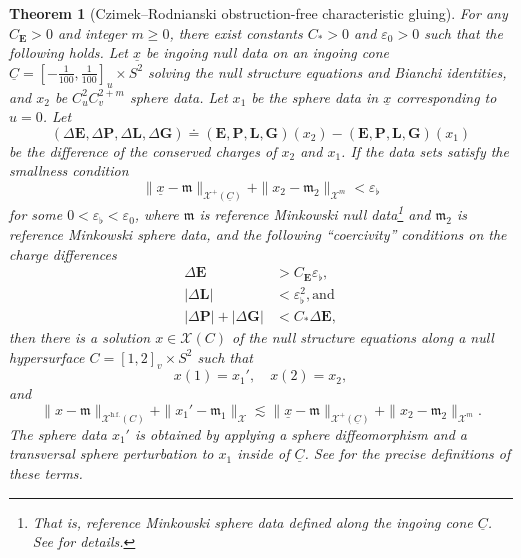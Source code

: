 \documentclass[10pt]{article}
\numberwithin{equation}{section}
\theoremstyle{plain}
\newtheorem{thm}{Theorem}%
\theoremstyle{definition}
\newcommand{\ve}{\varepsilon}
\newcommand{\les}{\lesssim}
\begin{document}
\begin{thm}[Czimek--Rodnianski obstruction-free characteristic gluing]\label{thm:CR}
For any $C_\mathbf E>0$ and integer $m\ge 0$, there exist constants $C_*>0$ and $\ve_0>0$ such that the following holds. Let $\underline x$ be ingoing null data on an ingoing cone $\underline C=[-\frac{1}{100},\frac{1}{100}]_u\times S^2$ solving the null structure equations and Bianchi identities, and $x_2$ be $C^2_u C^{2+m}_{v}$ sphere data. Let $x_1$ be the sphere data in $\underline x$ corresponding to $u=0$. Let 
\begin{equation*}
    (\Delta \mathbf E,\Delta\mathbf P,\Delta\mathbf L,\Delta\mathbf G)\doteq (\mathbf E,\mathbf P,\mathbf L,\mathbf G)(x_2)- (\mathbf E,\mathbf P,\mathbf L,\mathbf G)(x_1)
\end{equation*}
be the difference of the conserved charges of $x_2$ and $x_1$. If the data sets satisfy the smallness condition
\begin{equation}
    \|\underline x-\mathfrak m\|_{\mathcal X^+(\underline C)}+\|x_2-\mathfrak m_2\|_{\mathcal X^m}<\ve_\flat\label{eq:CR-cond-4}
\end{equation} 
for some $0<\ve_\flat<\ve_0$, where $\mathfrak m$ is reference Minkowski null data\footnote{That is, reference Minkowski sphere data defined along the ingoing cone $\underline{C}$. See \cite{ACR2} for details.} and $\mathfrak m_2$ is reference Minkowski sphere data, and the following ``coercivity'' conditions on the charge differences
\begin{align}
\label{eq:CR-cond-1}    \Delta\mathbf E &> C_\mathbf E \ve_\flat, \\
 \label{eq:CR-cond-2}     |\Delta\mathbf L|&< \ve^2_\flat, \text{and} \\
  \label{eq:CR-cond-3}    |\Delta \mathbf P|+|\Delta\mathbf G| &< C_*\Delta \mathbf E,
\end{align}
then there is a solution $x\in  \mathcal X(C)$ of the null structure equations along a null hypersurface $C=[1,2]_v\times S^2$ such that 
\begin{equation}
    x(1)=x_1' ,\quad x(2)=x_2,\label{eq:matching-1}
\end{equation}
and 
\begin{equation*}
    \|x-\mathfrak m\|_{\mathcal X^{\mathrm{h.f.}}(C)}+\| x_1'-\mathfrak m_1\|_{\mathcal X}\les \|\underline x-\mathfrak m\|_{\mathcal X^+(\underline C)}+\|x_2-\mathfrak m_2\|_{\mathcal X^m}.
\end{equation*}
The sphere data $x_1'$ is 
obtained by applying a sphere diffeomorphism and a transversal sphere perturbation to $x_1$ inside of $\underline C$. See \cite{ACR2, Czimek2022-cl} for the precise definitions of these terms.
\end{thm}
\end{document}
